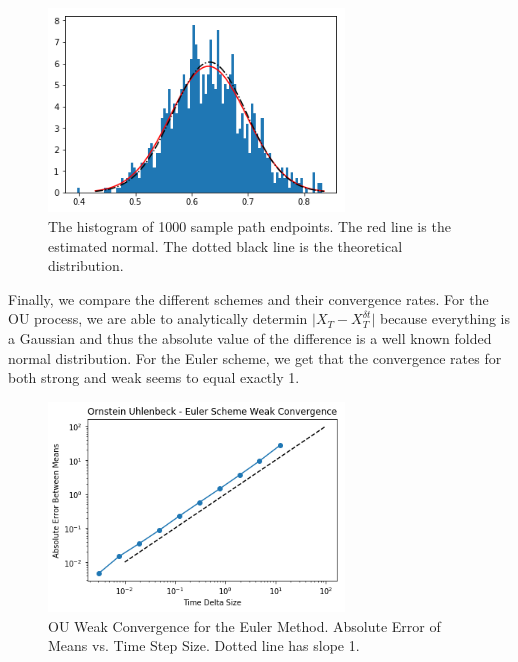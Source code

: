 \documentclass[notitlepage,pra,10pt,aps]{revtex4-2}
\begin{document}
  \begin{figure}[H]
    \centering
      \includegraphics[width=0.7\textwidth]{normal_ou.png}
    \caption{The histogram of 1000 sample path endpoints. The red line is the estimated normal. The dotted black line is the theoretical distribution.}
  \end{figure}

  Finally, we compare the different schemes and their convergence rates. For the OU process, we are able to analytically determin $\lvert X_T - X_T^{\delta t} \rvert$ because everything is a Gaussian and thus the absolute value of the difference is a well known folded normal distribution. For the Euler scheme, we get that the convergence rates for both strong and weak seems to equal exactly 1.

  \begin{figure}[H]
    \centering
      \includegraphics[width=0.7\textwidth]{ou_weak_euler.png}
    \caption{OU Weak Convergence for the Euler Method. Absolute Error of Means vs. Time Step Size. Dotted line has slope 1.}
  \end{figure}
\end{document}
